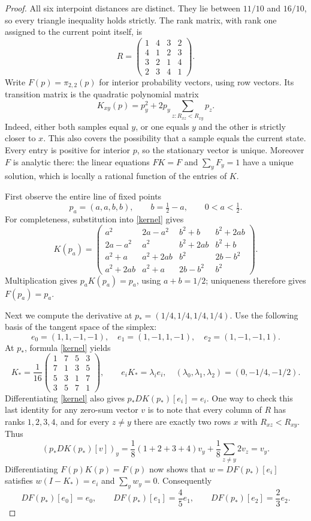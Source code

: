 \documentclass[11pt]{article}
\begin{document}
\begin{proof}
All six interpoint distances are distinct. They lie between $11/10$ and
$16/10$, so every triangle inequality holds strictly. The rank matrix,
with rank one assigned to the current point itself, is
\[
 R=\begin{pmatrix}1&4&3&2\\4&1&2&3\\3&2&1&4\\2&3&4&1\end{pmatrix}.
\]
Write $F(p)=\pi_{2,2}(p)$ for interior probability vectors, using row vectors.
Its transition matrix is the quadratic polynomial matrix
\begin{equation}\label{kernel}
 K_{xy}(p)=p_y^2+2p_y\sum_{z:R_{xz}<R_{xy}}p_z.
\end{equation}
Indeed, either both samples equal $y$, or one equals $y$ and the other is
strictly closer to $x$. This also covers the possibility that a sample
equals the current state. Every entry is positive for interior $p$, so
the stationary vector is unique. Moreover $F$ is analytic there: the
linear equations $F K=F$ and $\sum_yF_y=1$ have a unique solution, which
is locally a rational function of the entries of $K$.

First observe the entire line of fixed points
\begin{equation}\label{fixed}
 p_a=(a,a,b,b),\qquad b=\tfrac12-a,\qquad 0<a<\tfrac12.
\end{equation}
For completeness, substitution into \eqref{kernel} gives
\[
K(p_a)=\begin{pmatrix}
a^2&2a-a^2&b^2+b&b^2+2ab\\
2a-a^2&a^2&b^2+2ab&b^2+b\\
a^2+a&a^2+2ab&b^2&2b-b^2\\
a^2+2ab&a^2+a&2b-b^2&b^2
\end{pmatrix}.
\]
Multiplication gives $p_aK(p_a)=p_a$, using $a+b=1/2$; uniqueness
therefore gives $F(p_a)=p_a$.

Next we compute the derivative at $p_*=(1/4,1/4,1/4,1/4)$.
Use the following basis of the tangent space of the simplex:
\[
 e_0=(1,1,-1,-1),\quad e_1=(1,-1,1,-1),\quad e_2=(1,-1,-1,1).
\]
At $p_*$, formula \eqref{kernel} yields
\[
 K_* =\frac1{16}\begin{pmatrix}
 1&7&5&3\\7&1&3&5\\5&3&1&7\\3&5&7&1
 \end{pmatrix},\qquad
 e_iK_* =\lambda_i e_i,\quad
 (\lambda_0,\lambda_1,\lambda_2)=(0,-1/4,-1/2).
\]
Differentiating \eqref{kernel} also gives $p_* DK(p_*)[e_i]=e_i$.
One way to check this last identity for any zero-sum vector $v$ is to
note that every column of $R$ has ranks $1,2,3,4$, and for every $z\ne y$
there are exactly two rows $x$ with $R_{xz}<R_{xy}$. Thus
\[
 (p_*DK(p_*)[v])_y
 =\frac18(1+2+3+4)v_y+\frac18\sum_{z\ne y}2v_z=v_y.
\]
Differentiating $F(p)K(p)=F(p)$ now shows that $w=DF(p_*)[e_i]$
satisfies $w(I-K_*)=e_i$ and $\sum_yw_y=0$. Consequently
\begin{equation}\label{derivative}
 DF(p_*)[e_0]=e_0,\qquad
 DF(p_*)[e_1]=\frac45e_1,\qquad
 DF(p_*)[e_2]=\frac23e_2.
\end{equation}


\end{proof}
\end{document}
